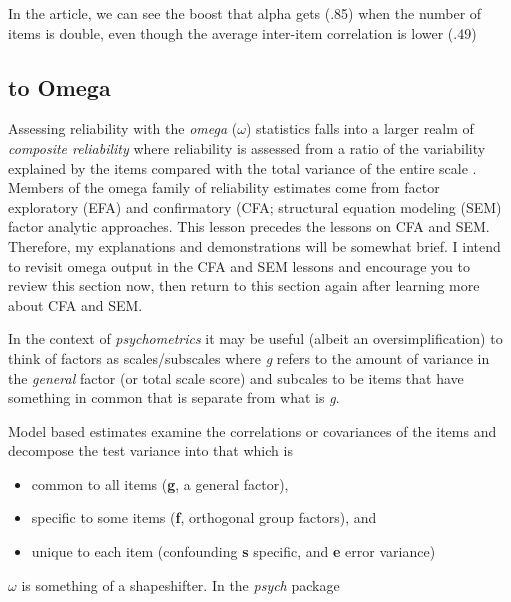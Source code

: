 \documentclass[
  english,
]{book}
\providecommand{\tightlist}{%
  \setlength{\itemsep}{0pt}\setlength{\parskip}{0pt}}
\begin{document}
In the article, we can see the boost that alpha gets (.85) when the number of items is double, even though the average inter-item correlation is lower (.49)

\hypertarget{to-omega}{%
\subsection{to Omega}\label{to-omega}}

Assessing reliability with the \emph{omega} (\(\omega\)) statistics falls into a larger realm of \emph{composite reliability} where reliability is assessed from a ratio of the variability explained by the items compared with the total variance of the entire scale \citep{mcneish_thanks_2018}. Members of the omega family of reliability estimates come from factor exploratory (EFA) and confirmatory (CFA; structural equation modeling (SEM) factor analytic approaches. This lesson precedes the lessons on CFA and SEM. Therefore, my explanations and demonstrations will be somewhat brief. I intend to revisit omega output in the CFA and SEM lessons and encourage you to review this section now, then return to this section again after learning more about CFA and SEM.

In the context of \emph{psychometrics} it may be useful (albeit an oversimplification) to think of factors as scales/subscales where \emph{g} refers to the amount of variance in the \emph{general} factor (or total scale score) and subcales to be items that have something in common that is separate from what is \emph{g}.

Model based estimates examine the correlations or covariances of the items and decompose the test variance into that which is

\begin{itemize}
\tightlist
\item
  common to all items (\textbf{g}, a general factor),
\item
  specific to some items (\textbf{f}, orthogonal group factors), and
\item
  unique to each item (confounding \textbf{s} specific, and \textbf{e} error variance)
\end{itemize}

\(\omega\) is something of a shapeshifter. In the \emph{psych} package
\end{document}

